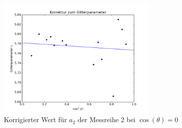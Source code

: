 \begin{figure}[hb]
 \includegraphics[width=0.7\textwidth]{../auswertung/a2.png}
 \caption{Korrigierter Wert für $a_2$ der Messreihe 2 bei $\cos(\theta)=0$}
 \label{pic:fita2}
\end{figure}








